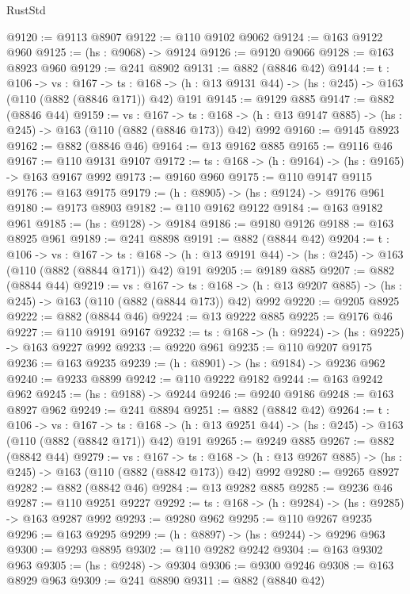 \begin{lexlean}{RustStd}
\begin{coremodule}
@9120 := @9113 @8907
@9122 := @110 @9102 @9062
@9124 := @163 @9122 @960
@9125 := (hs : @9068) -> @9124
@9126 := @9120 @9066
@9128 := @163 @8923 @960
@9129 := @241 @8902
@9131 := @882 (@8846 @42)
@9144 := {t : @106} ->
  {vs : @167} ->
  {ts : @168} -> (h : @13 @9131 @44) -> (hs : @245) -> @163 (@110 (@882 (@8846 @171)) @42) @191
@9145 := @9129 @885
@9147 := @882 (@8846 @44)
@9159 := {vs : @167} ->
  {ts : @168} -> (h : @13 @9147 @885) -> (hs : @245) -> @163 (@110 (@882 (@8846 @173)) @42) @992
@9160 := @9145 @8923
@9162 := @882 (@8846 @46)
@9164 := @13 @9162 @885
@9165 := @9116 @46
@9167 := @110 @9131 @9107
@9172 := {ts : @168} -> (h : @9164) -> (hs : @9165) -> @163 @9167 @992
@9173 := @9160 @960
@9175 := @110 @9147 @9115
@9176 := @163 @9175
@9179 := (h : @8905) -> (hs : @9124) -> @9176 @961
@9180 := @9173 @8903
@9182 := @110 @9162 @9122
@9184 := @163 @9182 @961
@9185 := (hs : @9128) -> @9184
@9186 := @9180 @9126
@9188 := @163 @8925 @961
@9189 := @241 @8898
@9191 := @882 (@8844 @42)
@9204 := {t : @106} ->
  {vs : @167} ->
  {ts : @168} -> (h : @13 @9191 @44) -> (hs : @245) -> @163 (@110 (@882 (@8844 @171)) @42) @191
@9205 := @9189 @885
@9207 := @882 (@8844 @44)
@9219 := {vs : @167} ->
  {ts : @168} -> (h : @13 @9207 @885) -> (hs : @245) -> @163 (@110 (@882 (@8844 @173)) @42) @992
@9220 := @9205 @8925
@9222 := @882 (@8844 @46)
@9224 := @13 @9222 @885
@9225 := @9176 @46
@9227 := @110 @9191 @9167
@9232 := {ts : @168} -> (h : @9224) -> (hs : @9225) -> @163 @9227 @992
@9233 := @9220 @961
@9235 := @110 @9207 @9175
@9236 := @163 @9235
@9239 := (h : @8901) -> (hs : @9184) -> @9236 @962
@9240 := @9233 @8899
@9242 := @110 @9222 @9182
@9244 := @163 @9242 @962
@9245 := (hs : @9188) -> @9244
@9246 := @9240 @9186
@9248 := @163 @8927 @962
@9249 := @241 @8894
@9251 := @882 (@8842 @42)
@9264 := {t : @106} ->
  {vs : @167} ->
  {ts : @168} -> (h : @13 @9251 @44) -> (hs : @245) -> @163 (@110 (@882 (@8842 @171)) @42) @191
@9265 := @9249 @885
@9267 := @882 (@8842 @44)
@9279 := {vs : @167} ->
  {ts : @168} -> (h : @13 @9267 @885) -> (hs : @245) -> @163 (@110 (@882 (@8842 @173)) @42) @992
@9280 := @9265 @8927
@9282 := @882 (@8842 @46)
@9284 := @13 @9282 @885
@9285 := @9236 @46
@9287 := @110 @9251 @9227
@9292 := {ts : @168} -> (h : @9284) -> (hs : @9285) -> @163 @9287 @992
@9293 := @9280 @962
@9295 := @110 @9267 @9235
@9296 := @163 @9295
@9299 := (h : @8897) -> (hs : @9244) -> @9296 @963
@9300 := @9293 @8895
@9302 := @110 @9282 @9242
@9304 := @163 @9302 @963
@9305 := (hs : @9248) -> @9304
@9306 := @9300 @9246
@9308 := @163 @8929 @963
@9309 := @241 @8890
@9311 := @882 (@8840 @42)

\end{coremodule}
\end{lexlean}
